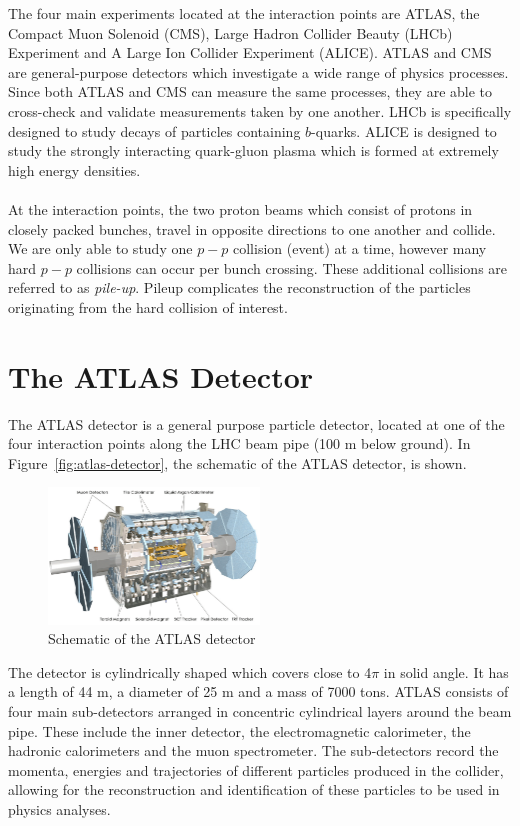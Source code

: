 The four main experiments located at the interaction points are ATLAS, the Compact Muon Solenoid (CMS), Large Hadron Collider Beauty (LHCb) Experiment and A Large Ion Collider Experiment (ALICE). ATLAS and CMS are general-purpose detectors which investigate a wide range of physics processes. Since both ATLAS and CMS can measure the same processes, they are able to cross-check and validate measurements taken by one another. LHCb is specifically designed to study decays of particles containing $b$-quarks. ALICE is designed to study the strongly interacting quark-gluon plasma which is formed at extremely high energy densities.\\\\

At the interaction points, the two proton beams which consist of protons in closely packed bunches, travel in opposite directions to one another and collide. We are only able to study one $p-p$ collision (event) at a time, however many hard $p-p$ collisions can occur per bunch crossing. These additional collisions are referred to as \textit{pile-up}. Pileup complicates the reconstruction of the particles originating from the hard collision of interest. 



\section{The ATLAS Detector}
The ATLAS detector is a general purpose particle detector, located at one of the four interaction points along the LHC beam pipe (100 m below ground). 
In Figure~\ref{fig:atlas-detector}, the schematic of the ATLAS detector, is shown.


\begin{figure}[h!]
 \includegraphics[width=0.5\textwidth]{figures/theoryFigs/atlasDetector.png}
\caption{Schematic of the ATLAS detector~\cite{Collaboration_2008}}
\end{figure}


The detector is cylindrically shaped which covers close to 4$\pi$ in solid angle. It has a length of 44 m, a diameter of 25 m and a mass of 7000 tons. ATLAS consists of four main sub-detectors arranged in concentric cylindrical layers around the beam pipe. These include the inner detector, the electromagnetic calorimeter, the hadronic calorimeters and the muon spectrometer. The sub-detectors record the momenta, energies and trajectories of different particles produced in the collider, allowing for the reconstruction and identification of these particles to be used in physics analyses.

